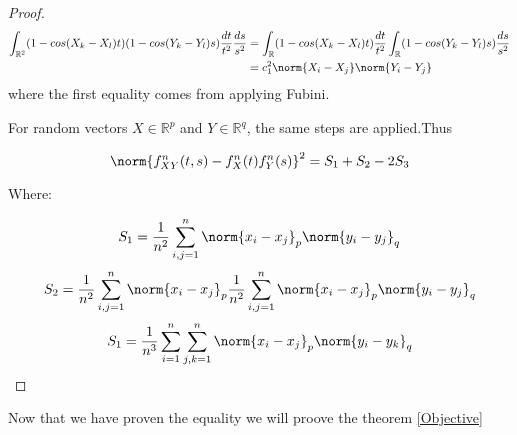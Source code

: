 \begin{proof}
\begin{equation}{}
\begin{split}
\int_{\mathbb{R}^{2}}(1-cos(X_{k}-X_{l})t)(1-cos(Y_{k}-Y_{l})s)\frac{dt}{t^{2}}\frac{ds}{s^{2}} &
= \int_{\mathbb{R}}(1-cos(X_{k}-X_{l})t)\frac{dt}{t^{2}}\int_{\mathbb{R}}(1-cos(Y_{k}-Y_{l})s)\frac{ds}{s^{2}} \\
&= c_{1}^{2}\norm{X_{i}-X_{j}}\norm{Y_{i}-Y_{j}}
\end{split}
\end{equation}
where the first equality comes from applying Fubini.

For random vectors $X\in\mathbb{R}^{p}$ and $Y\in\mathbb{R}^{q}$, the same steps are applied.Thus

$$
\norm{f_{XY}^{n}(t,s) - f_{X}^{n}(t)f_{Y}^{n}(s)}^{2} = S_{1} +S_{2}-2S_{3}
$$

Where:

$$
S_{1} =\frac{1}{n^{2}} \sum_{i,j=1}^{n}\norm{x_{i}-x_{j}}_{p}\norm{y_{i}-y_{j}}_{q}
$$
$$
S_{2} =\frac{1}{n^{2}} \sum_{i,j=1}^{n}\norm{x_{i}-x_{j}}_{p}\frac{1}{n^{2}} \sum_{i,j=1}^{n}\norm{x_{i}-x_{j}}_{p}\norm{y_{i}-y_{j}}_{q}
$$
$$
S_{1} =\frac{1}{n^{3}} \sum_{i=1}^{n}\sum_{j,k=1}^{n}\norm{x_{i}-x_{j}}_{p}\norm{y_{i}-y_{k}}_{q}
$$
\end{proof}
Now that we have proven the equality we will proove the theorem \ref{Objective}
